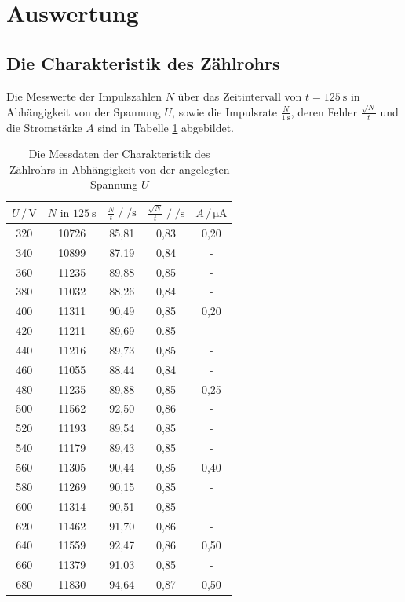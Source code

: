 \section{Auswertung}
\label{sec:Auswertung}

\subsection{Die Charakteristik des Zählrohrs}

Die Messwerte der Impulszahlen $N$ über das Zeitintervall
von $t = \SI{125}{\second}$ in Abhängigkeit von der Spannung $U$, 
sowie die Impulsrate $\frac{N}{\SI{1}{\second}}$, deren Fehler
$\frac{\sqrt{N}}{t}$ und die Stromstärke $A$ sind in Tabelle \ref{tab:mess} abgebildet.

\begin{table}
  \centering
  \caption{Die Messdaten der Charakteristik des Zählrohrs in Abhängigkeit 
            von der angelegten Spannung $U$}
  \label{tab:mess}
  \begin{tabular}{c c c c c}
  \toprule
  $U \,/\, \si{\volt}$ & $N \text{ in } \SI{125}{\second}$ & 
  $\frac{N}{t} \;/\; \si{\per\second}$
  & $\frac{\sqrt{N}}{t} \;/\; \si{\per\second}$ & $A \,/\, \si{\micro\ampere}$\\
  \midrule 
  320 & 10726 & 85,81 & 0,83 & 0,20 \\
  340 & 10899 & 87,19 & 0,84 &  - \\
  360 & 11235 & 89,88 & 0,85 &  - \\
  380 & 11032 & 88,26 & 0,84 &  - \\
  400 & 11311 & 90,49 & 0,85 & 0,20 \\
  420 & 11211 & 89,69 & 0.85 &  - \\
  440 & 11216 & 89,73 & 0,85 &  - \\
  460 & 11055 & 88,44 & 0,84 &  - \\
  480 & 11235 & 89,88 & 0,85 & 0,25 \\
  500 & 11562 & 92,50 & 0,86 &  - \\
  520 & 11193 & 89,54 & 0,85 &  - \\
  540 & 11179 & 89,43 & 0,85 &  - \\
  560 & 11305 & 90,44 & 0,85 & 0,40 \\
  580 & 11269 & 90,15 & 0,85 &  - \\
  600 & 11314 & 90,51 & 0,85 &  - \\
  620 & 11462 & 91,70 & 0,86 &  - \\
  640 & 11559 & 92,47 & 0,86 & 0,50 \\
  660 & 11379 & 91,03 & 0,85 &  -  \\
  680 & 11830 & 94,64 & 0,87 & 0,50 \\
  \bottomrule
  \end{tabular}
  \end{table}

